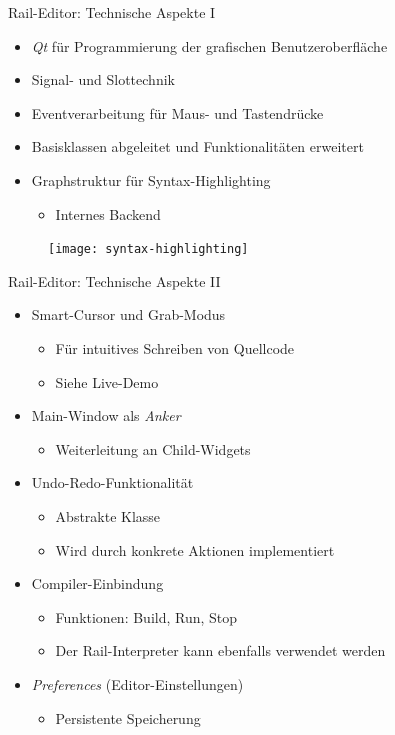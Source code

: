 \begin{frame}{Rail-Editor: Technische Aspekte I}
	\pause
	\begin{itemize}
		\item \textit{Qt} für Programmierung der grafischen Benutzeroberfläche
		\pause
		\item Signal- und Slottechnik
		\pause
		\item Eventverarbeitung für Maus- und Tastendrücke
		\pause
		\item Basisklassen abgeleitet und Funktionalitäten erweitert
		\pause
		\item Graphstruktur für Syntax-Highlighting
		\begin{itemize}
			\item Internes Backend
		\end{itemize}
	\end{itemize}
	
	\begin{figure}
		\centering
		\texttt{[image: syntax-highlighting]}
	\end{figure}
\end{frame}

\begin{frame}{Rail-Editor: Technische Aspekte II}
	\pause
	\begin{itemize}
	\item Smart-Cursor und Grab-Modus
	\begin{itemize}
	\item Für intuitives Schreiben von Quellcode
	\item Siehe Live-Demo
	\end{itemize}
	\pause
	\item Main-Window als \textit{Anker}
	\begin{itemize}
	\item Weiterleitung an Child-Widgets
	\end{itemize}
	\pause
	\item Undo-Redo-Funktionalität
	\begin{itemize}
	\item Abstrakte Klasse
	\item Wird durch konkrete Aktionen implementiert
	\end{itemize}
	\pause
	\item Compiler-Einbindung
	\begin{itemize}
	\item Funktionen: Build, Run, Stop
	\item Der Rail-Interpreter kann ebenfalls verwendet werden
	\end{itemize}
	\pause
	\item \textit{Preferences} (Editor-Einstellungen)
	\begin{itemize}
	\item Persistente Speicherung
	\end{itemize}
	\end{itemize}
\end{frame}	

